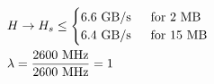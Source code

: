 \documentclass{standalone}
\begin{document}
\begin{equation*}
\begin{aligned}
&H \rightarrow H_s \leq
	\begin{cases}
    		6.6 \text{ GB/s} & \text{\: for 2 MB} \\
	   	6.4 \text{ GB/s} & \text{\: for 15 MB}
  	\end{cases} \\
&\lambda = \frac{2600 \text{ MHz}}{2600 \text{ MHz}} = 1
\end{aligned}
\end{equation*}
\end{document}
